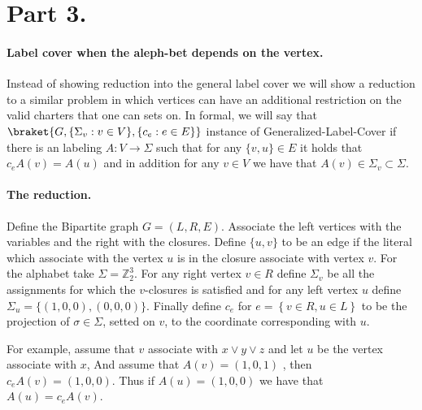 \documentclass{article}
\begin{document}
\section{Part 3.}

\paragraph{Label cover when the aleph-bet depends on the vertex.} Instead of showing reduction into the general label cover we will show a reduction to a similar problem in which vertices can have an additional restriction on the valid charters that one can sets on. In formal, we will say that $\braket{G, \{ \Sigma_{v} : v \in V \}, \{c_{e} : e \in E \}} $ instance of Generalized-Label-Cover if there is an labeling $A : V \rightarrow \Sigma$ such that for any $\{v,u\} \in E$ it holds that $c_{e}A(v) = A(u)$ and in addition for any $v \in V$ we have that $A(v) \in \Sigma_{v} \subset \Sigma$.  

\paragraph{The reduction.} Define the Bipartite graph $G = (L,R,E)$. Associate the left vertices with the variables and the right with the closures. Define $\{u,v\}$ to be an edge if the literal which associate with the vertex $u$ is in the closure associate with vertex $v$. For the alphabet take $\Sigma = \mathbb{Z}_{2}^3$. For any right vertex $v\in R$ define $\Sigma_{v}$ be all the assignments for which the $v$-closures is satisfied and for any left vertex $u$ define $\Sigma_{u} = \{ \left( 1 , 0 , 0 \right), \left( 0 , 0, 0 \right) \}$. Finally define $c_{e}$ for $ e = \left\{ v \in R, u \in L \right\}$ to be the projection of $\sigma \in \Sigma$, setted on $v$, to the coordinate corresponding with $u$.

For example, assume that $v$ associate with $x\vee y \vee z $ and let $u$ be the vertex associate with $x$, And assume that $A(v) = (1,0,1)$ , then $c_{e}A(v) = (1,0,0)$. Thus if $A(u) = (1,0,0)$ we have that $A(u) = c_{e}A(v)$. 

\end{document}
